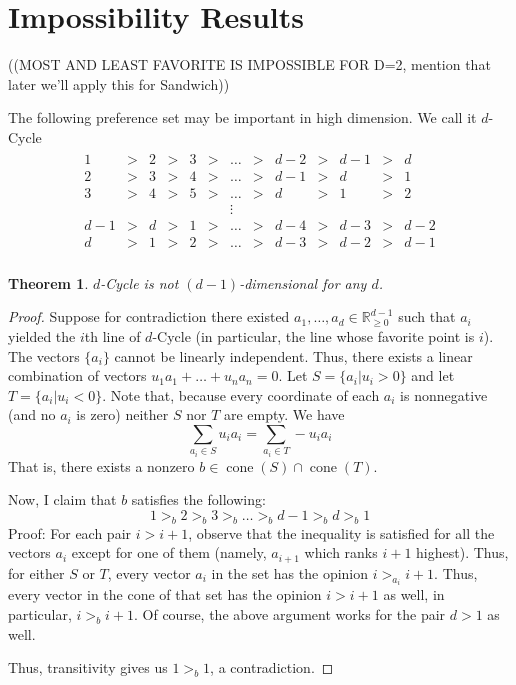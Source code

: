 \documentclass[12pt]{article}
\newtheorem{theorem}{Theorem}
\newcommand{\Rgz}{\mathbb{R}_{\ge 0}}
\DeclareMathOperator*{\cone}{cone}
\newcommand{\1}[1]{\mathds{1}[{#1}]}
\begin{document}
\section{Impossibility Results}

  ((MOST AND LEAST FAVORITE IS IMPOSSIBLE FOR D=2,
  mention that later we'll apply this for Sandwich))

  The following preference set may be important in high dimension.
  We call it $d$-{\sc Cycle}
  \begin{align*}
    \begin{array}{ccccccccccccccccccccccccccccccccccccccccc}
    1 &>& 2 &>& 3 &>&\ldots &>& d-2 &>& d-1 &>& d \\
    2 &>& 3 &>& 4 &>& \ldots &>& d-1 &>& d &>& 1 \\
    3 &>& 4 &>& 5 &>& \ldots &>& d &>& 1 &>& 2 \\
      &&    &&    &&   \vdots \\
    d-1&>&d&>& 1 &>&\ldots &>& d-4 &>& d-3 &>& d-2\\
    d &>& 1 &>& 2 &>& \ldots &>& d-3 &>& d-2 &>& d-1 \\
    \end{array}
  \end{align*}
  \begin{theorem}
    $d$-{\sc Cycle} is not $(d-1)$-dimensional for any $d$.
  \end{theorem}
  \begin{proof}
    Suppose for contradiction there existed
    $a_1,\ldots,a_d\in\Rgz^{d-1}$ such that $a_i$ yielded the $i$th line of
    $d$-{\sc Cycle} (in particular, the line whose favorite point is $i$).
    The vectors $\{a_i\}$ cannot be linearly independent.
    Thus, there exists a linear combination of vectors
    $u_1 a_1 + \ldots + u_n a_n = 0$.
    Let $S = \{a_i | u_i > 0\}$ and let $T = \{a_i | u_i < 0\}$.
    Note that, because every coordinate of each $a_i$ is nonnegative
    (and no $a_i$ is zero) neither $S$ nor $T$ are empty.
    We have
    \[ \sum_{a_i \in S} u_i a_i = \sum_{a_i \in T} -u_i a_i \]
    That is, there exists a nonzero $b\in \cone(S) \cap \cone(T)$.

    Now, I claim that $b$ satisfies the following:
    \[ 1 >_b 2 >_b 3 >_b \ldots >_b d-1 >_b d >_b 1 \]
    Proof: For each pair $i > i+1$,
    observe that the inequality is satisfied for all the vectors $a_i$ except
    for one of them (namely, $a_{i+1}$ which ranks $i+1$ highest).
    Thus, for either $S$ or $T$, every vector $a_i$ in the set has the opinion
    $i >_{a_i} i+1$. Thus, every vector in the cone of that set
    has the opinion $i > i+1$ as well, in particular, $i >_b i+1$.
    Of course, the above argument works for the pair $d>1$ as well.

    Thus, transitivity gives us $1>_b 1$, a contradiction.
  \end{proof}
\end{document}
